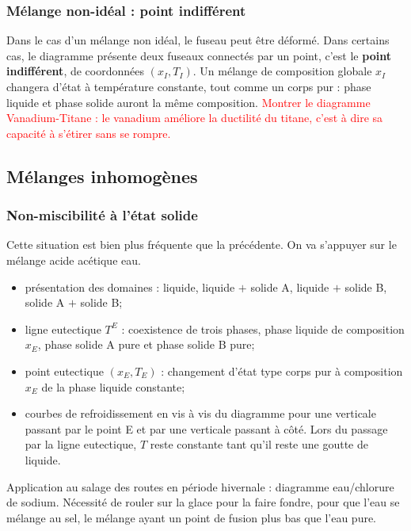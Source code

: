 \documentclass[11pt,a4paper]{report}
\begin{document}
	\subsubsection{Mélange non-idéal : point indifférent}
	Dans le cas d'un mélange non idéal, le fuseau peut être déformé. Dans certains cas, le diagramme présente deux fuseaux connectés par un point, c'est le \textbf{point indifférent}, de coordonnées $(x_I,T_I)$. Un mélange de composition globale $x_I$ changera d'état à température constante, tout comme un corps pur : phase liquide et phase solide auront la même composition. \textcolor{red}{Montrer le diagramme Vanadium-Titane : le vanadium améliore la ductilité du titane, c'est à dire sa capacité à s'étirer sans se rompre.}
		
\subsection{Mélanges inhomogènes}

\subsubsection{Non-miscibilité à l'état solide}
	
Cette situation est bien plus fréquente que la précédente. On va s'appuyer sur le mélange acide acétique eau.
\begin{itemize}
	\item présentation des domaines : liquide, liquide $+$ solide A, liquide $+$ solide B, 		solide A $+$ solide B;
	\item ligne eutectique $T^E$ : coexistence de trois phases, phase liquide de 					composition $x_E$, phase solide A pure et phase solide B pure;
	\item point eutectique $(x_E,T_E)$ : changement d'état type corps pur à 
		composition $x_E$ de la phase liquide constante;
	\item courbes de refroidissement en vis à vis du diagramme pour une verticale passant 			par le point E et par une verticale passant à côté. Lors du passage par la ligne 			eutectique, $T$ reste constante tant qu'il reste une goutte de liquide.
\end{itemize} 

Application au salage des routes en période hivernale : diagramme eau/chlorure de sodium. Nécessité de rouler sur la glace pour la faire fondre, pour que l'eau se mélange au sel, le mélange ayant un point de fusion plus bas que l'eau pure.
\end{document}

